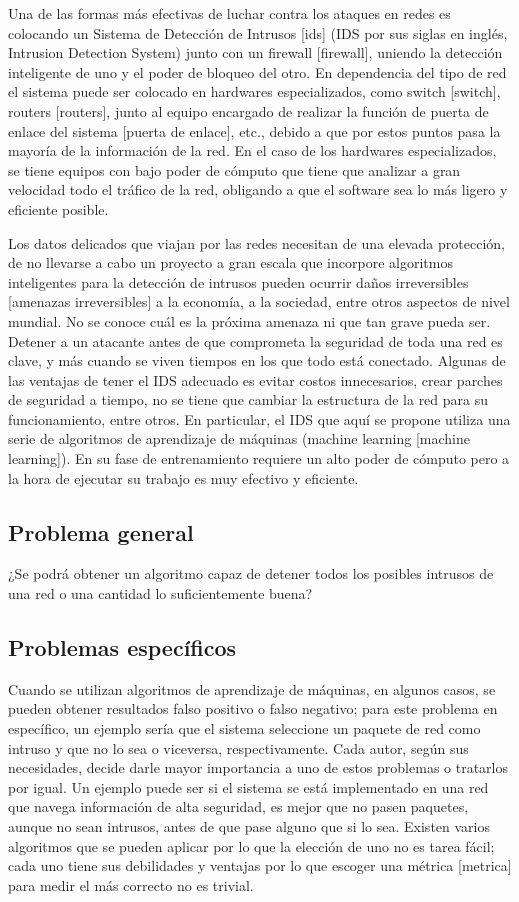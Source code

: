 Una de las formas más efectivas de luchar contra los ataques en redes es colocando un Sistema de Detección de Intrusos [ids] (IDS por sus siglas en inglés, Intrusion Detection System) junto con un firewall [firewall], uniendo la detección inteligente de uno y el poder de bloqueo del otro. En dependencia del tipo de red el sistema puede ser colocado en hardwares especializados, como switch [switch], routers [routers], junto al equipo encargado de realizar la función de puerta de enlace del sistema [puerta de enlace],  etc., debido a que por estos puntos pasa la mayoría de la información de la red. En el caso de los hardwares especializados, se tiene equipos con bajo poder de cómputo que tiene que analizar a gran velocidad todo el tráfico de la red, obligando a que el software sea lo más ligero y eficiente posible.

Los datos delicados que viajan por las redes necesitan de una elevada protección, de no llevarse a cabo un proyecto a gran escala que incorpore algoritmos inteligentes para la detección de intrusos pueden ocurrir daños irreversibles [amenazas irreversibles] a la economía, a la sociedad, entre otros aspectos de nivel mundial. No se conoce cuál es la próxima amenaza ni que tan grave pueda ser. Detener a un atacante antes de que comprometa la seguridad de toda una red es clave, y más cuando se viven tiempos en los que todo está conectado. Algunas de las ventajas de tener el IDS adecuado es evitar costos innecesarios, crear parches de seguridad a tiempo, no se tiene que cambiar la estructura de la red para su funcionamiento, entre otros. En particular, el IDS que aquí se propone utiliza una serie de algoritmos de aprendizaje de máquinas (machine learning [machine learning]). En su fase de entrenamiento requiere un alto poder de cómputo pero a la hora de ejecutar su trabajo es muy efectivo y eficiente.

\subsection*{Problema general}
¿Se podrá obtener un algoritmo capaz de detener todos los posibles intrusos de una red o una cantidad lo suficientemente buena?

\subsection*{Problemas específicos}
Cuando se utilizan algoritmos de aprendizaje de máquinas, en algunos casos, se pueden obtener resultados falso positivo o falso negativo; para este problema en específico, un ejemplo sería que el sistema seleccione un paquete de red como intruso y que no lo sea o viceversa, respectivamente. Cada autor, según sus necesidades, decide darle mayor importancia a uno de estos problemas o tratarlos por igual. Un ejemplo puede ser si el sistema se está implementado en una red que navega información de alta seguridad, es mejor que no pasen paquetes, aunque no sean intrusos, antes de que pase alguno que si lo sea. Existen varios algoritmos que se pueden aplicar por lo que la elección de uno no es tarea fácil; cada uno tiene sus debilidades y ventajas por lo que escoger una métrica [metrica] para medir el más correcto no es trivial.

